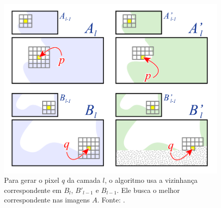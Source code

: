\begin{figure}[!ht]
	\centering
	\includegraphics[width=\linewidth*2/3]{files/assets/articles/heartzmann2.png}
	\caption{Para gerar o pixel $q$ da camada $l$, o algoritmo
	usa a vizinhança correspondente em $B_l$, $B'_{l-1}$ e $B_{l-1}$.
	Ele busca o melhor correspondente nas imagens $A$.
	Fonte: \cite{Hertzmann2001}.}
	\label{hertz}
\end{figure}

